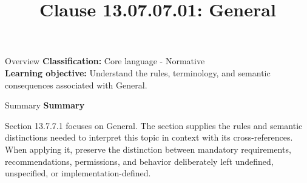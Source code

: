 \documentclass[10pt,letterpaper]{article}
\title{Clause 13.07.07.01: General}
\author{}
\date{}
\begin{document}
\maketitle
\begin{CornellOverviewBox}{Overview}
\textbf{Classification:} Core language - Normative\\[2pt]
\textbf{Learning objective:} Understand the rules, terminology, and semantic consequences associated with General.
\end{CornellOverviewBox}\begin{CornellSummaryBox}{Summary}
{\sffamily\bfseries\color{Accent} Summary}\par\vspace{3pt}Section 13.7.7.1 focuses on General. The section supplies the rules and semantic distinctions needed to interpret this topic in context with its cross-references. When applying it, preserve the distinction between mandatory requirements, recommendations, permissions, and behavior deliberately left undefined, unspecified, or implementation-defined.
\end{CornellSummaryBox}
\end{document}
